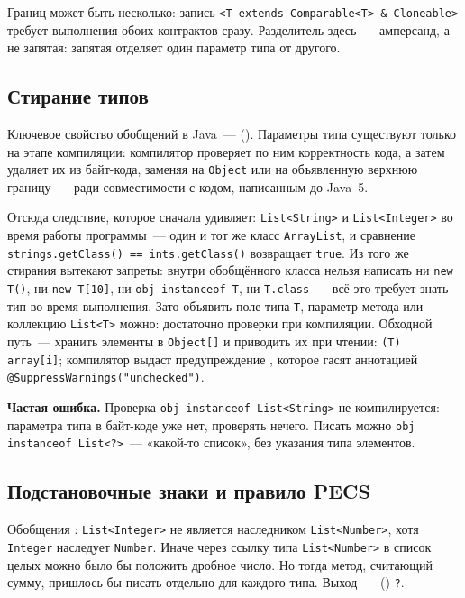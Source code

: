 Границ может быть несколько: запись
\texttt{<T extends Comparable<T> \& Cloneable>} требует выполнения обоих
контрактов сразу. Разделитель здесь~--- амперсанд, а не запятая: запятая
отделяет один параметр типа от другого.

\subsection{Стирание типов}

Ключевое свойство обобщений в Java~---  (). Параметры типа существуют только на этапе компиляции: компилятор
проверяет по ним корректность кода, а затем удаляет их из байт-кода, заменяя на
\texttt{Object} или на объявленную верхнюю границу~--- ради совместимости с
кодом, написанным до Java~5.

Отсюда следствие, которое сначала удивляет: \texttt{List<String>} и
\texttt{List<Integer>} во время работы программы~--- один и тот же класс
\texttt{ArrayList}, и сравнение \texttt{strings.getClass() == ints.getClass()}
возвращает \texttt{true}. Из того же стирания вытекают запреты: внутри
обобщённого класса нельзя написать ни \texttt{new T()}, ни \texttt{new T[10]},
ни \texttt{obj instanceof T}, ни \texttt{T.class}~--- всё это требует знать тип
во время выполнения. Зато объявить поле типа \texttt{T}, параметр метода или
коллекцию \texttt{List<T>} можно: достаточно проверки при компиляции. Обходной
путь~--- хранить элементы в \texttt{Object[]} и приводить их при чтении:
\texttt{(T) array[i]}; компилятор выдаст предупреждение ,
которое гасят аннотацией \texttt{@SuppressWarnings("unchecked")}.

\begin{oshibka}
\textbf{Частая ошибка.} Проверка \texttt{obj instanceof List<String>} не
компилируется: параметра типа в байт-коде уже нет, проверять нечего. Писать
можно \texttt{obj instanceof List<?>}~--- «какой-то список», без указания типа
элементов.
\end{oshibka}

\subsection{Подстановочные знаки и правило PECS}

Обобщения : \texttt{List<Integer>} не является наследником
\texttt{List<Number>}, хотя \texttt{Integer} наследует \texttt{Number}. Иначе
через ссылку типа \texttt{List<Number>} в список целых можно было бы положить
дробное число. Но тогда метод, считающий сумму, пришлось бы писать отдельно для
каждого типа. Выход~---  () \texttt{?}.

